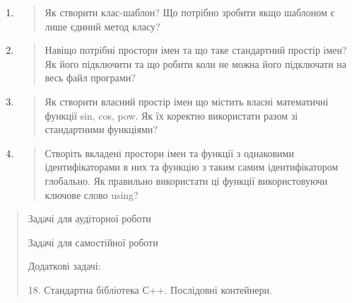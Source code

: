 \documentclass[]{article}
\begin{document}
\begin{enumerate}
\def\labelenumi{\arabic{enumi})}
\item
  \begin{quote}
  Як створити клас-шаблон? Що потрібно зробити якщо шаблоном є лише
  єдиний метод класу?
  \end{quote}
\item
  \begin{quote}
  Навіщо потрібні простори імен та що таке стандартний простір імен? Як
  його підключити та що робити коли не можна його підключати на весь
  файл програми?
  \end{quote}
\item
  \begin{quote}
  Як створити власний простір імен що містить власні математичні функції
  sin, cos, pow. Як їх коректно використати разом зі стандартними
  функціями?
  \end{quote}
\item
  \begin{quote}
  Створіть вкладені простори імен та функції з однаковими
  ідентифікаторами в них та функцію з таким самим ідентифікатором
  глобально. Як правильно використати ці функції використовуючи ключове
  слово using?
  \end{quote}
\end{enumerate}

\begin{quote}
Задачі для аудіторної роботи

Задачі для самостійної роботи

Додаткові задачі:

18. Стандартна бібліотека С++. Послідовні контейнери.
\end{quote}
\end{document}
